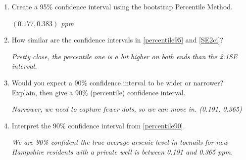 \begin{enumerate}
\begin{key}
  {\it $ 0.272 \pm 2.11(0.053) = (0.16, 0.38)$ ppm}
\end{key}

\item  \label{percentile95} Create a 95\% confidence interval using
  the bootstrap   Percentile Method.
\begin{students}
  \vspace{1cm}
\end{students}

\begin{key}
  {\it $ (0.177, 0.383)$ ppm}
\end{key}

\item  How similar are the confidence intervals in \ref{percentile95}
  and \ref{SE2ci}?
\begin{students}
  \vspace{1cm}
\end{students}

\begin{key}
  {\it Pretty close, the percentile one is a bit higher on both ends
    than the 2.1SE interval.}
\end{key}


\item \label{percentile90}Would you expect a 90\% confidence interval
  to be wider or narrower?  Explain, then give a 90\% (percentile)
  confidence interval.
\begin{students}
  \vspace{2cm}
\end{students}

\begin{key}
  {\it Narrower, we need to capture fewer dots, so we can move in.
    (0.191, 0.365)} 
\end{key}

\item  Interpret the 90\% confidence interval from \ref{percentile90}.
\begin{students}
  \vspace{2cm}
\end{students}

\begin{key}
  {\it We are 90\% confident the true average arsenic level in
    toenails for new Hampshire residents  with a private well is
    between 0.191 and 0.365 ppm. }
\end{key}
\end{enumerate}


